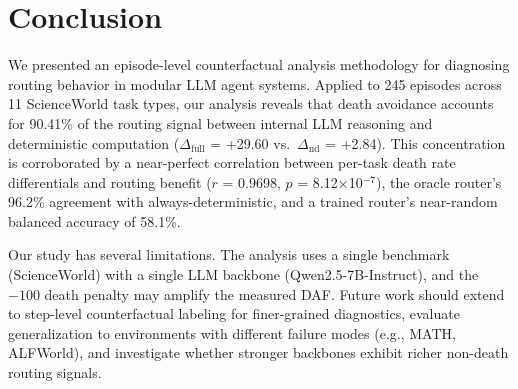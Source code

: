 \section{Conclusion}

We presented an episode-level counterfactual analysis methodology for diagnosing routing behavior in modular LLM agent systems. Applied to 245 episodes across 11 ScienceWorld task types, our analysis reveals that death avoidance accounts for 90.41\% of the routing signal between internal LLM reasoning and deterministic computation ($\Delta_{\text{full}}$ = +29.60 vs.\ $\Delta_{\text{nd}}$ = +2.84). This concentration is corroborated by a near-perfect correlation between per-task death rate differentials and routing benefit ($r$ = 0.9698, $p$ = 8.12$\times$10$^{-7}$), the oracle router's 96.2\% agreement with always-deterministic, and a trained router's near-random balanced accuracy of 58.1\%.

Our study has several limitations. The analysis uses a single benchmark (ScienceWorld) with a single LLM backbone (Qwen2.5-7B-Instruct), and the $-100$ death penalty may amplify the measured DAF. Future work should extend to step-level counterfactual labeling for finer-grained diagnostics, evaluate generalization to environments with different failure modes (e.g., MATH, ALFWorld), and investigate whether stronger backbones exhibit richer non-death routing signals.
